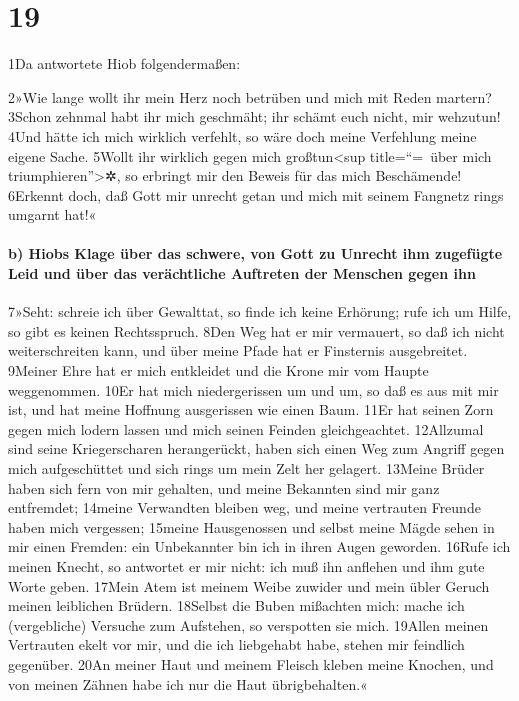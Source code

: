 \hypertarget{section-18}{%
\section{19}\label{section-18}}

1Da antwortete Hiob folgendermaßen:

2»Wie lange wollt ihr mein Herz noch betrüben und mich mit Reden
martern? 3Schon zehnmal habt ihr mich geschmäht; ihr schämt euch nicht,
mir wehzutun! 4Und hätte ich mich wirklich verfehlt, so wäre doch meine
Verfehlung meine eigene Sache. 5Wollt ihr wirklich gegen mich
großtun\textless sup title=``=~über mich triumphieren''\textgreater✲, so
erbringt mir den Beweis für das mich Beschämende! 6Erkennt doch, daß
Gott mir unrecht getan und mich mit seinem Fangnetz rings umgarnt hat!«

\hypertarget{b-hiobs-klage-uxfcber-das-schwere-von-gott-zu-unrecht-ihm-zugefuxfcgte-leid-und-uxfcber-das-veruxe4chtliche-auftreten-der-menschen-gegen-ihn}{%
\paragraph{b) Hiobs Klage über das schwere, von Gott zu Unrecht ihm
zugefügte Leid und über das verächtliche Auftreten der Menschen gegen
ihn}\label{b-hiobs-klage-uxfcber-das-schwere-von-gott-zu-unrecht-ihm-zugefuxfcgte-leid-und-uxfcber-das-veruxe4chtliche-auftreten-der-menschen-gegen-ihn}}

7»Seht: schreie ich über Gewalttat, so finde ich keine Erhörung; rufe
ich um Hilfe, so gibt es keinen Rechtsspruch. 8Den Weg hat er mir
vermauert, so daß ich nicht weiterschreiten kann, und über meine Pfade
hat er Finsternis ausgebreitet. 9Meiner Ehre hat er mich entkleidet und
die Krone mir vom Haupte weggenommen. 10Er hat mich niedergerissen um
und um, so daß es aus mit mir ist, und hat meine Hoffnung ausgerissen
wie einen Baum. 11Er hat seinen Zorn gegen mich lodern lassen und mich
seinen Feinden gleichgeachtet. 12Allzumal sind seine Kriegerscharen
herangerückt, haben sich einen Weg zum Angriff gegen mich aufgeschüttet
und sich rings um mein Zelt her gelagert. 13Meine Brüder haben sich fern
von mir gehalten, und meine Bekannten sind mir ganz entfremdet; 14meine
Verwandten bleiben weg, und meine vertrauten Freunde haben mich
vergessen; 15meine Hausgenossen und selbst meine Mägde sehen in mir
einen Fremden: ein Unbekannter bin ich in ihren Augen geworden. 16Rufe
ich meinen Knecht, so antwortet er mir nicht: ich muß ihn anflehen und
ihm gute Worte geben. 17Mein Atem ist meinem Weibe zuwider und mein
übler Geruch meinen leiblichen Brüdern. 18Selbst die Buben mißachten
mich: mache ich (vergebliche) Versuche zum Aufstehen, so verspotten sie
mich. 19Allen meinen Vertrauten ekelt vor mir, und die ich liebgehabt
habe, stehen mir feindlich gegenüber. 20An meiner Haut und meinem
Fleisch kleben meine Knochen, und von meinen Zähnen habe ich nur die
Haut übrigbehalten.«

